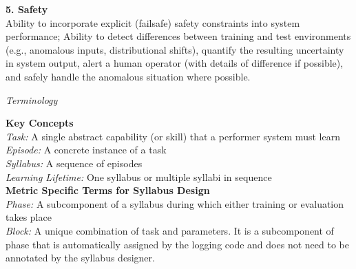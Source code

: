 \textbf{5. Safety}\\

Ability to incorporate explicit (failsafe) safety constraints into system performance; Ability to detect differences between training and test environments (e.g., anomalous inputs, distributional shifts), quantify the resulting uncertainty in system output, alert a human operator (with details of difference if possible), and safely handle the anomalous situation where possible.\\[0.2in]

\begin{large}
\textit{Terminology}\\[0.1in]
\end{large}

\textbf{Key Concepts}\\[0.1in]
\textit{Task:} A single abstract capability (or skill) that a performer system must learn\\
\textit{Episode:} A concrete instance of a task\\
\textit{Syllabus:} A sequence of episodes\\
\textit{Learning Lifetime:} One syllabus or multiple syllabi in sequence\\[0.2in]

\textbf{Metric Specific Terms for Syllabus Design}\\[0.1in]
\textit{Phase:} A subcomponent of a syllabus during which either training or evaluation takes place\\
\textit{Block:} A unique combination of task and parameters. It is a subcomponent of phase that is automatically assigned by the logging code and does not need to be annotated by the syllabus designer.\\
